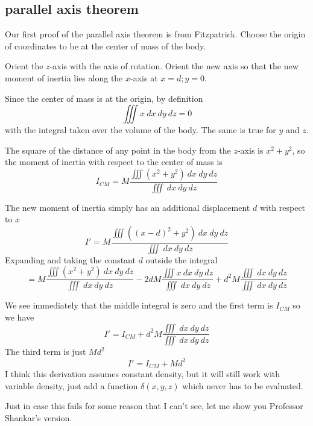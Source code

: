 \documentclass[11pt, oneside]{article}
\begin{document}
\subsection*{parallel axis theorem}
Our first proof of the parallel axis theorem is from Fitzpatrick.  Choose the origin of coordinates to be at the center of mass of the body.  

Orient the $z$-axis with the axis of rotation.  Orient the new axis so that the new moment of inertia lies along the $x$-axis at $x=d; y =0$.

Since the center of mass is at the origin, by definition
\[ \iiint x \ dx \ dy \ dz = 0 \]
with the integral taken over the volume of the body.  The same is true for $y$ and $z$.

The square of the distance of any point in the body from the $z$-axis is $x^2 + y^2$, so the moment of inertia with respect to the center of mass is
\[ I_{CM} = M \frac{\iiint (x^2 + y^2) \ dx \ dy \ dz}{\iiint \ dx \ dy \ dz} \]

The new moment of inertia simply has an additional displacement $d$ with respect to $x$
\[ I' = M \frac{\iiint ((x-d)^2 + y^2) \ dx \ dy \ dz}{\iiint \ dx \ dy \ dz} \]
Expanding and taking the constant $d$ outside the integral
\[ = M \frac{\iiint (x^2 + y^2) \ dx \ dy \ dz}{\iiint \ dx \ dy \ dz} - 2dM \frac{\iiint x \ dx \ dy \ dz}{\iiint \ dx \ dy \ dz} + d^2M \frac{\iiint \ dx \ dy \ dz}{\iiint \ dx \ dy \ dz}\]

We see immediately that the middle integral is zero and the first term is $I_{CM}$ so we have
\[ I' = I_{CM} + d^2M \frac{\iiint \ dx \ dy \ dz}{\iiint \ dx \ dy \ dz}\]
The third term is just $Md^2$
\[ I' = I_{CM} + Md^2 \]
I think this derivation assumes constant density, but it will still work with variable density, just add a function $\delta(x,y,z)$ which never has to be evaluated.

Just in case this fails for some reason that I can't see, let me show you Professor Shankar's version.
\end{document}
